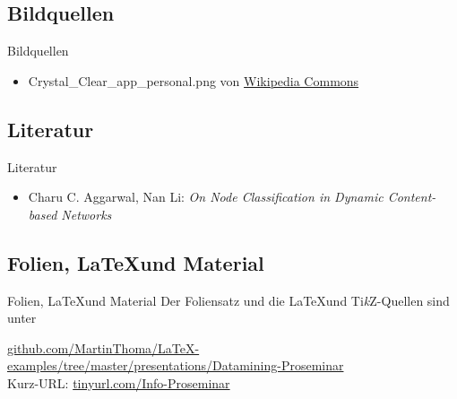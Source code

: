 \subsection{Bildquellen}
\begin{frame}{Bildquellen}
\begin{itemize}
	\item Crystal\_Clear\_app\_personal.png von \href{https://commons.wikimedia.org/wiki/File:Crystal_Clear_app_personal.png}{Wikipedia Commons}
\end{itemize}
\end{frame}

\subsection{Literatur}
\begin{frame}{Literatur}
\begin{itemize}
    \item Charu C. Aggarwal, Nan Li: \textit{On Node Classification in Dynamic Content-based Networks}
\end{itemize}
\end{frame}

\subsection{Folien, \LaTeX und Material}
\begin{frame}{Folien, \LaTeX und Material}
Der Foliensatz und die \LaTeX und Ti\textit{k}Z-Quellen sind unter

\href{https://github.com/MartinThoma/LaTeX-examples/tree/master/presentations/Datamining-Proseminar}{github.com/MartinThoma/LaTeX-examples/tree/master/presentations/Datamining-Proseminar}
\\

Kurz-URL:
\href{http://tinyurl.com/Info-Proseminar}{tinyurl.com/Info-Proseminar}
\end{frame}
